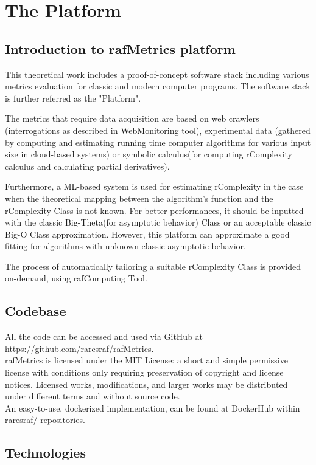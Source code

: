 \chapter{The Platform}


\section{Introduction to rafMetrics platform}
This theoretical work includes a proof-of-concept software stack including various metrics evaluation for classic and modern computer programs. The software stack is further referred as the "Platform".

The metrics that require data acquisition are based on web crawlers (interrogations as described in WebMonitoring tool), experimental data (gathered by computing and estimating running time computer algorithms for various input size in cloud-based systems) or symbolic calculus(for computing rComplexity calculus and calculating partial derivatives).

Furthermore, a ML-based system is used for estimating rComplexity in the case when the theoretical mapping between the algorithm's function and the rComplexity Class is not known. For better performances, it should be inputted with the classic Big-Theta(for asymptotic behavior) Class or an acceptable classic Big-O Class approximation. However, this platform can approximate a good fitting for algorithms with unknown classic asymptotic behavior.

The process of automatically tailoring a suitable rComplexity Class is provided on-demand, using rafComputing Tool.


\section{Codebase}
All the code can be accessed and used via GitHub at \href{https://github.com/raresraf/rafMetrics}{https://github.com/raresraf/rafMetrics}.
\\
rafMetrics is licensed under the MIT License: a short and simple permissive license with conditions only requiring preservation of copyright and license notices. Licensed works, modifications, and larger works may be distributed under different terms and without source code.
\\
An easy-to-use, dockerized implementation, can be found at DockerHub within raresraf/ repositories.


\section{Technologies}


